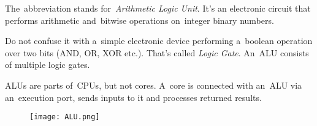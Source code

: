 \label{alu}
The~abbreviation stands for~\textit{Arithmetic Logic Unit}.
It's an electronic circuit that performs arithmetic and~bitwise operations on~integer binary numbers.

\warning Do not confuse it with a~simple electronic device performing a~boolean operation over two bits (AND, OR, XOR etc.).
That's called \textit{Logic Gate}.
An~ALU consists of multiple logic gates.

\warning ALUs are parts of~CPUs, but not cores.
A~core is connected with an~ALU via an~execution port, sends inputs to it and processes returned results.
\newpage

\begin{figure}
    \centering
    \texttt{[image: ALU.png]}
\end{figure}
